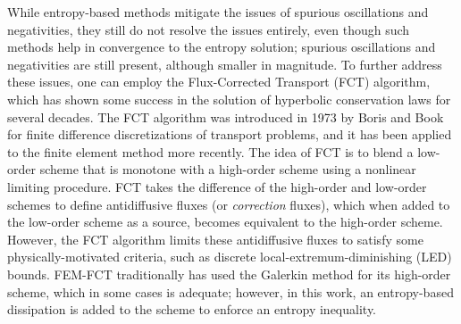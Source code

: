 While entropy-based methods mitigate the issues of spurious oscillations
and negativities, they still do not resolve the issues entirely, even
though such methods help in convergence to the entropy solution; spurious
oscillations and negativities are still present, although smaller in
magnitude. To further address these issues, one can employ the Flux-Corrected Transport (FCT)
algorithm, which has shown some success in the solution of hyperbolic
conservation laws for several decades.
The FCT algorithm was introduced in 1973 by Boris and Book\cite{borisbook} for
finite difference discretizations of transport problems, and it has
been applied to the finite element method more recently. The idea of FCT
is to blend a low-order scheme that is monotone with a high-order
scheme using a nonlinear limiting procedure. FCT takes the difference
of the high-order and low-order schemes to define antidiffusive
fluxes (or \emph{correction} fluxes), which when added to the low-order
scheme as a source, becomes equivalent to the high-order scheme. However,
the FCT algorithm limits these antidiffusive fluxes to satisfy some
physically-motivated criteria, such as discrete local-extremum-diminishing
(LED) bounds. FEM-FCT traditionally has used the Galerkin method for
its high-order scheme, which in some cases is adequate; however, in
this work, an entropy-based dissipation is added to the scheme to enforce
an entropy inequality.

